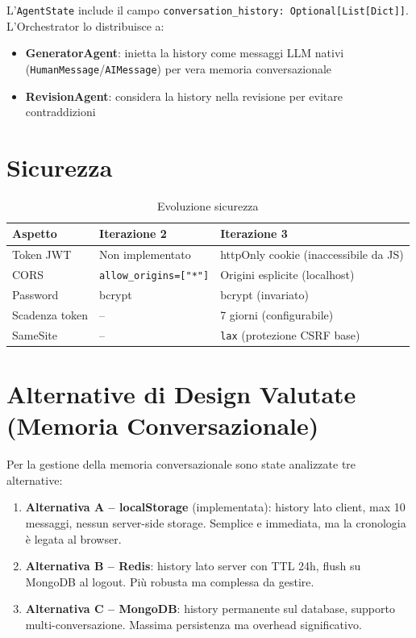 \documentclass[a4paper,12pt]{report}
\begin{document}
L'\texttt{AgentState} include il campo \texttt{conversation\_history: Optional[List[Dict]]}. L'Orchestrator lo distribuisce a:
\begin{itemize}
    \item \textbf{GeneratorAgent}: inietta la history come messaggi LLM nativi (\texttt{HumanMessage}/\texttt{AIMessage}) per vera memoria conversazionale
    \item \textbf{RevisionAgent}: considera la history nella revisione per evitare contraddizioni
\end{itemize}

\section{Sicurezza}

\begin{table}[H]
\centering
\begin{tabularx}{\textwidth}{l X X}
\toprule
\textbf{Aspetto} & \textbf{Iterazione 2} & \textbf{Iterazione 3} \\
\midrule
Token JWT & Non implementato & httpOnly cookie (inaccessibile da JS) \\
CORS & \texttt{allow\_origins=["*"]} & Origini esplicite (localhost) \\
Password & bcrypt & bcrypt (invariato) \\
Scadenza token & -- & 7 giorni (configurabile) \\
SameSite & -- & \texttt{lax} (protezione CSRF base) \\
\bottomrule
\end{tabularx}
\caption{Evoluzione sicurezza}
\end{table}

\section{Alternative di Design Valutate (Memoria Conversazionale)}

Per la gestione della memoria conversazionale sono state analizzate tre alternative:

\begin{enumerate}
    \item \textbf{Alternativa A -- localStorage} (implementata): history lato client, max 10 messaggi, nessun server-side storage. Semplice e immediata, ma la cronologia è legata al browser.
    \item \textbf{Alternativa B -- Redis}: history lato server con TTL 24h, flush su MongoDB al logout. Più robusta ma complessa da gestire.
    \item \textbf{Alternativa C -- MongoDB}: history permanente sul database, supporto multi-conversazione. Massima persistenza ma overhead significativo.
\end{enumerate}
\end{document}
